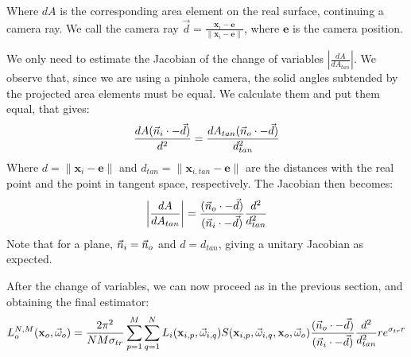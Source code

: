 \documentclass[10pt,a4paper]{article}
\begin{document}
Where $dA$ is the corresponding area element on the real surface, continuing a camera ray. We call the camera ray $\vec{d} = \frac{\mathbf{x}_i - \mathbf{e}}{\|\mathbf{x}_i - \mathbf{e}\|} $, where $\mathbf{e}$ is the camera position. 

We only need to estimate the Jacobian of the change of variables $\left|\frac{dA}{dA_{tan}} \right|$. We observe that, since we are using a pinhole camera, the solid angles subtended by the projected area elements must be equal. We calculate them and put them equal, that gives:
$$
\frac{dA (\vec{n}_i \cdot -\vec{d})}{d^2} = \frac{dA_{tan} (\vec{n}_o \cdot -\vec{d})}{d_{tan}^2} 
$$
Where $d = \|\mathbf{x}_i - \mathbf{e}\|$ and $d_{tan} = \|\mathbf{x}_{i,tan} - \mathbf{e}\|$ are the distances with the real point and the point in tangent space, respectively. The Jacobian then becomes:
$$
\left|\frac{dA}{dA_{tan}} \right| = \frac{(\vec{n}_o \cdot -\vec{d})}{(\vec{n}_i \cdot -\vec{d})} \frac{d^2}{d_{tan}^2}
$$
Note that for a plane, $\vec{n}_i = \vec{n}_o$ and $d = d_{tan}$, giving a unitary Jacobian as expected.

After the change of variables, we can now proceed as in the previous section, and obtaining the final estimator:
$$
L_o^{N,M}(\mathbf{x}_o, \vec{\omega}_o) = \frac{2 \pi^2}{NM \sigma_{tr}}\sum_{p=1}^M \sum_{q=1}^N L_i(\mathbf{x}_{i,p}, \vec{\omega}_{i,q}) S(\mathbf{x}_{i,p}, \vec{\omega}_{i,q}, \mathbf{x}_o, \vec{\omega}_o)\frac{(\vec{n}_o \cdot -\vec{d})}{(\vec{n}_i \cdot -\vec{d})} \frac{d^2}{d_{tan}^2}   r e^{\sigma_{tr} r} 
$$





\end{document}
